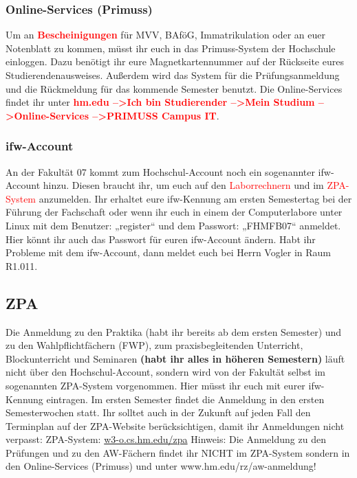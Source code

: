 \subsubsection{Online-Services (Primuss)}
Um an \textcolor{red}{\textbf{Bescheinigungen}} für MVV, BAföG, Immatrikulation oder an euer Notenblatt zu kommen, müsst ihr euch in das Primuss-System der Hochschule einloggen. Dazu benötigt ihr eure Magnetkartennummer auf der Rückseite eures Studierendenausweises. Außerdem wird das System für die Prüfungsanmeldung und die Rückmeldung für das kommende Semester benutzt.\doublebreak
Die Online-Services findet ihr unter \textcolor{red}{\textbf{hm.edu --\textgreater Ich bin Studierender --\textgreater Mein Studium --\textgreater Online-Services --\textgreater PRIMUSS Campus IT}}.

\subsubsection{ifw-Account}

An der Fakultät 07 kommt zum Hochschul-Account noch ein sogenannter ifw-Account hinzu. Diesen braucht ihr, um euch auf den \textcolor{red}{Laborrechnern} und im \textcolor{red}{ZPA-System} anzumelden.\doublebreak
Ihr erhaltet eure ifw-Kennung am ersten Semestertag bei der Führung der Fachschaft oder wenn ihr euch in einem der Computerlabore unter Linux mit dem Benutzer: „register“ und dem Passwort: „FHMFB07“ anmeldet. Hier könnt ihr auch das Passwort für euren ifw-Account ändern. \doublebreak
Habt ihr Probleme mit dem ifw-Account, dann meldet euch bei Herrn Vogler in Raum R1.011.

\subsection{ZPA}

Die Anmeldung zu den Praktika (habt ihr bereits ab dem ersten Semester) und zu den Wahlpflichtfächern (FWP), zum praxisbegleitenden Unterricht, Blockunterricht und Seminaren \textbf{(habt ihr alles in höheren Semestern)} läuft nicht über den Hochschul-Account, sondern wird von der Fakultät selbst im sogenannten ZPA-System vorgenommen. Hier müsst ihr euch mit eurer ifw-Kennung eintragen. Im ersten Semester findet die Anmeldung in den ersten Semesterwochen statt. Ihr solltet auch in der Zukunft auf jeden Fall den Terminplan auf der ZPA-Website berücksichtigen, damit ihr Anmeldungen nicht verpasst:\doublebreak
ZPA-System: \url{w3-o.cs.hm.edu/zpa}\doublebreak
Hinweis: Die Anmeldung zu den Prüfungen und zu den AW-Fächern findet ihr NICHT im ZPA-System sondern in den Online-Services (Primuss) und unter www.hm.edu/rz/aw-anmeldung!

